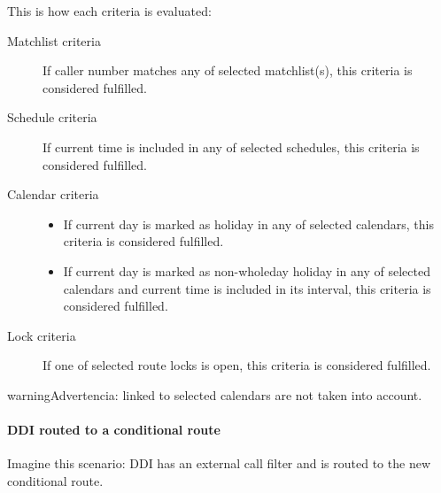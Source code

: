 \documentclass[letterpaper,10pt,spanish]{sphinxmanual}
\begin{document}
This is how each criteria is evaluated:
\begin{description}
\item[{Matchlist criteria}] \leavevmode{}\label{administration_portal/client/vpbx/routing_endpoints/conditional_routes:term-matchlist-criteria}
If caller number matches any of selected matchlist(s), this criteria is considered fulfilled.

\item[{Schedule criteria}] \leavevmode{}\label{administration_portal/client/vpbx/routing_endpoints/conditional_routes:term-schedule-criteria}
If current time is included in any of selected schedules, this criteria is considered fulfilled.

\item[{Calendar criteria}] \leavevmode{}\label{administration_portal/client/vpbx/routing_endpoints/conditional_routes:term-calendar-criteria}\begin{itemize}
\item {} 
If current day is marked as holiday in any of selected calendars, this criteria is considered fulfilled.

\item {} 
If current day is marked as non-wholeday holiday in any of selected calendars and current time is included
in its interval, this criteria is considered fulfilled.

\end{itemize}

\item[{Lock criteria}] \leavevmode{}\label{administration_portal/client/vpbx/routing_endpoints/conditional_routes:term-lock-criteria}
If one of selected route locks is open, this criteria is considered fulfilled.

\end{description}

\begin{notice}{warning}{Advertencia:}
{\hyperref[administration_portal/client/vpbx/routing_tools/calendars:calendar\string-periods]{}} linked to selected calendars are not taken into account.
\end{notice}


\paragraph{DDI routed to a conditional route}
\label{administration_portal/client/vpbx/routing_endpoints/conditional_routes:ddi-routed-to-a-conditional-route}
Imagine this scenario: DDI has an external call filter and is routed to the new conditional route.
\end{document}
